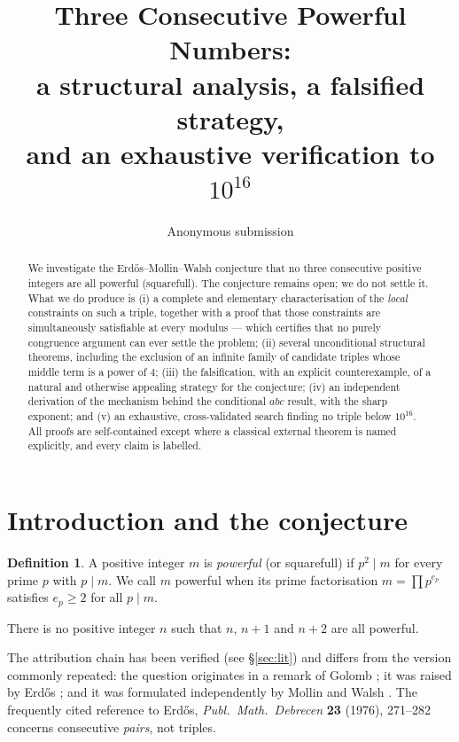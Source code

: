 \documentclass[11pt]{article}
\title{\bfseries Three Consecutive Powerful Numbers:\\
a structural analysis, a falsified strategy,\\
and an exhaustive verification to $10^{16}$}
\author{Anonymous submission}
\date{}
\theoremstyle{definition}
\newtheorem{definition}[theorem]{Definition}
\begin{document}
\maketitle

\begin{abstract}
We investigate the Erdős--Mollin--Walsh conjecture that no three consecutive positive
integers are all powerful (squarefull). The conjecture remains open; we do not settle
it. What we do produce is (i) a complete and elementary characterisation of the
\emph{local} constraints on such a triple, together with a proof that those constraints
are simultaneously satisfiable at every modulus --- which certifies that no purely
congruence argument can ever settle the problem; (ii) several unconditional structural
theorems, including the exclusion of an infinite family of candidate triples whose
middle term is a power of $4$; (iii) the falsification, with an explicit
counterexample, of a natural and otherwise appealing strategy for the conjecture;
(iv) an independent derivation of the mechanism behind the conditional $abc$ result,
with the sharp exponent; and (v) an exhaustive, cross-validated search finding no
triple below $10^{16}$. All proofs are self-contained except where a classical
external theorem is named explicitly, and every claim is labelled.
\end{abstract}

\section{Introduction and the conjecture}

\begin{definition}
A positive integer $m$ is \emph{powerful} (or squarefull) if $p^2\mid m$ for every
prime $p$ with $p\mid m$. We call $m$ powerful when its prime factorisation
$m=\prod p^{e_p}$ satisfies $e_p\ge 2$ for all $p\mid m$.
\end{definition}

\begin{conjecture}
There is no positive integer $n$ such that $n$, $n+1$ and $n+2$ are all powerful.
\end{conjecture}

The attribution chain has been verified (see \S\ref{sec:lit}) and differs from the
version commonly repeated: the question originates in a remark of Golomb
\cite{golomb1970}; it was raised by Erdős \cite{erdos1976cn}; and it was formulated
independently by Mollin and Walsh \cite{mollinwalsh1986a,mollinwalsh1986b}. The
frequently cited reference to Erdős, \emph{Publ.\ Math.\ Debrecen} \textbf{23}
(1976), 271--282 concerns consecutive \emph{pairs}, not triples.
\end{document}
